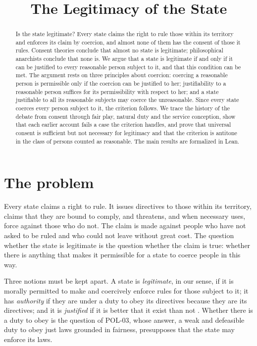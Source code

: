\documentclass{situationist-preprint}
\title{The Legitimacy of the State}
\begin{document}
\maketitle

\begin{abstract}
Is the state legitimate? Every state claims the right to rule those within its territory and enforces its claim by coercion, and almost none of them has the consent of those it rules. Consent theories conclude that almost no state is legitimate; philosophical anarchists conclude that none is. We argue that a state is legitimate if and only if it can be justified to every reasonable person subject to it, and that this condition can be met. The argument rests on three principles about coercion: coercing a reasonable person is permissible only if the coercion can be justified to her; justifiability to a reasonable person suffices for its permissibility with respect to her; and a state justifiable to all its reasonable subjects may coerce the unreasonable. Since every state coerces every person subject to it, the criterion follows. We trace the history of the debate from consent through fair play, natural duty and the service conception, show that each earlier account fails a case the criterion handles, and prove that universal consent is sufficient but not necessary for legitimacy and that the criterion is antitone in the class of persons counted as reasonable. The main results are formalized in Lean.
\end{abstract}

\section{The problem}

Every state claims a right to rule. It issues directives to those within its territory, claims that they are bound to comply, and threatens, and when necessary uses, force against those who do not. The claim is made against people who have not asked to be ruled and who could not leave without great cost. The question whether the state is legitimate is the question whether the claim is true: whether there is anything that makes it permissible for a state to coerce people in this way.

Three notions must be kept apart. A state is \emph{legitimate}, in our sense, if it is morally permitted to make and coercively enforce rules for those subject to it; it has \emph{authority} if they are under a duty to obey its directives because they are its directives; and it is \emph{justified} if it is better that it exist than not \citep{Buchanan2002,Applbaum2010,Simmons1999}. Whether there is a duty to obey is the question of POL-03, whose answer, a weak and defeasible duty to obey just laws grounded in fairness, presupposes that the state may enforce its laws.
\end{document}
